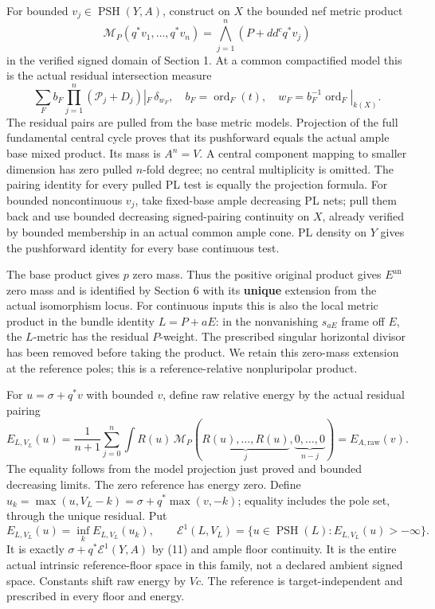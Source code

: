 \documentclass[
  10pt,
]{article}
\begin{document}
For bounded \(v_j\in\operatorname{PSH}(Y,A)\), construct on \(X\) the
bounded nef metric product \[\mathcal M_P(q^*v_1,\ldots,q^*v_n)
       =\bigwedge_{j=1}^n(P+dd^c q^*v_j)\] in the verified signed domain
of Section 1. At a common compactified model this is the actual residual
intersection measure
\[\sum_F b_F\prod_{j=1}^n(\mathcal P_j+D_j)|_F\,\delta_{w_F},
  \quad b_F=\operatorname{ord}_F(t),\quad
  w_F=b_F^{-1}\operatorname{ord}_F|_{k(X)}.                            \tag{10}\]
The residual pairs are pulled from the base metric models. Projection of
the full fundamental central cycle proves that its pushforward equals
the actual ample base mixed product. Its mass is \(A^n=V\). A central
component mapping to smaller dimension has zero pulled \(n\)-fold
degree; no central multiplicity is omitted. The pairing identity for
every pulled PL test is equally the projection formula. For bounded
noncontinuous \(v_j\), take fixed-base ample decreasing PL nets; pull
them back and use bounded decreasing signed-pairing continuity on \(X\),
already verified by bounded membership in an actual common ample cone.
PL density on \(Y\) gives the pushforward identity for every base
continuous test.

The base product gives \(p\) zero mass. Thus the positive original
product gives \(E^{\mathrm{an}}\) zero mass and is identified by Section
6 with its \textbf{unique} extension from the actual isomorphism locus.
For continuous inputs this is also the local metric product in the
bundle identity \(L=P+aE\): in the nonvanishing \(s_{aE}\) frame off
\(E\), the \(L\)-metric has the residual \(P\)-weight. The prescribed
singular horizontal divisor has been removed before taking the product.
We retain this zero-mass extension at the reference poles; this is a
reference-relative nonpluripolar product.

For \(u=\sigma+q^*v\) with bounded \(v\), define raw relative energy by
the actual residual pairing
\[E_{L,V_L}(u)=\frac1{n+1}\sum_{j=0}^n\int R(u)\,
  \mathcal M_P(\underbrace{R(u),\ldots,R(u)}_j,
                    \underbrace{0,\ldots,0}_{n-j})=E_{A,\mathrm{raw}}(v). \tag{11}\]
The equality follows from the model projection just proved and bounded
decreasing limits. The zero reference has energy zero. Define
\(u_k=\max(u,V_L-k)=\sigma+q^*\max(v,-k)\); equality includes the pole
set, through the unique residual. Put
\[E_{L,V_L}(u)=\inf_k E_{L,V_L}(u_k),\qquad
\mathcal E^1(L,V_L)=\{u\in\operatorname{PSH}(L):E_{L,V_L}(u)>-\infty\}. \tag{12}\]
It is exactly \(\sigma+q^*\mathcal E^1(Y,A)\) by (11) and ample floor
continuity. It is the entire actual intrinsic reference-floor space in
this family, not a declared ambient signed space. Constants shift raw
energy by \(Vc\). The reference is target-independent and prescribed in
every floor and energy.
\end{document}
